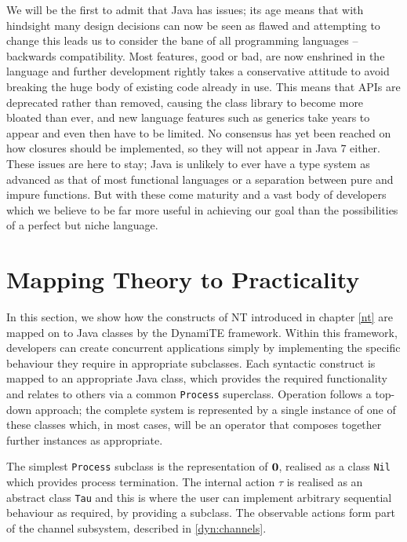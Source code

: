 We will be the first to admit that Java has issues; its age means that
with hindsight many design decisions can now be seen as flawed and
attempting to change this leads us to consider the bane of all
programming languages -- backwards compatibility.  Most features, good
or bad, are now enshrined in the language and further development
rightly takes a conservative attitude to avoid breaking the huge body
of existing code already in use.  This means that APIs are deprecated
rather than removed, causing the class library to become more bloated
than ever, and new language features such as generics take years to
appear and even then have to be limited.  No consensus has yet been
reached on how closures should be implemented, so they will not appear
in Java 7 either.  These issues are here to stay; Java is unlikely to
ever have a type system as advanced as that of most functional
languages or a separation between pure and impure functions.  But with
these come maturity and a vast body of developers which we believe to
be far more useful in achieving our goal than the possibilities of a
perfect but niche language.

\section{Mapping Theory to Practicality}
\label{dyn:maptheory}

In this section, we show how the constructs of NT introduced in
chapter \ref{nt} are mapped on to Java classes by the DynamiTE
framework.  Within this framework, developers can create concurrent
applications simply by implementing the specific behaviour they
require in appropriate subclasses.  Each syntactic construct is mapped
to an appropriate Java class, which provides the required
functionality and relates to others via a common \texttt{Process}
superclass.  Operation follows a top-down approach; the complete
system is represented by a single instance of one of these classes
which, in most cases, will be an operator that composes together
further instances as appropriate.

The simplest \texttt{Process} subclass is the representation of $\textbf{0}$,
realised as a class \texttt{Nil} which provides process termination.
The internal action $\tau$ is realised as an abstract class \texttt{Tau}
and this is where the user can implement arbitrary sequential behaviour
as required, by providing a subclass. The observable actions form part
of the channel subsystem, described in \ref{dyn:channels}.

